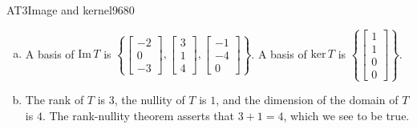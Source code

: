 \begin{exercise}{AT3}{Image and kernel}{9680}
\begin{exerciseAnswer}
\begin{enumerate}[(a)]
 
\item  

 A basis of \(\mathrm{Im}\,T\) is \(\left\{ \left[\begin{array}{c}
-2 \\
0 \\
-3
\end{array}\right] , \left[\begin{array}{c}
3 \\
1 \\
4
\end{array}\right] , \left[\begin{array}{c}
-1 \\
-4 \\
0
\end{array}\right] \right\}\). A basis of \(\mathrm{ker}\,T\) is \(\left\{ \left[\begin{array}{c}
1 \\
1 \\
0 \\
0
\end{array}\right] \right\}\). 

 
\item  

 The rank of \(T\) is \(3\), the nullity of \(T\) is \(1\), and the dimension of the domain of \(T\) is \(4\). The rank-nullity theorem asserts that \(3+1=4\), which we see to be true. 

 
\end{enumerate}

     \end{exerciseAnswer}
 \end{exercise}


